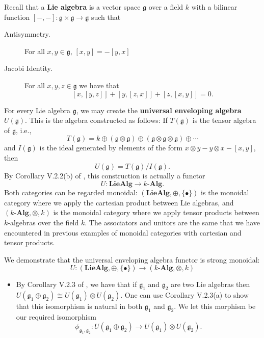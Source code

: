 \begin{example}
    Recall that a \textbf{Lie algebra} is a vector space $\mathfrak{g}$ over a field $k$ 
    with a bilinear function $[-,-]: \mathfrak{g} \times \mathfrak{g} \to \mathfrak{g}$ such that 
    \begin{description}
        \item[Antisymmetry.] For all $x, y \in \mathfrak{g}$, $[x, y] = -[y, x]$
        \item[Jacobi Identity.] For all $x, y, z \in \mathfrak{g}$ we have that 
        \[
            [x, [y, z]] + [y, [z, x]] + [z, [x,y]] = 0.
        \]
    \end{description}
    For every Lie algebra $\mathfrak{g}$, we may create the \textbf{universal enveloping algebra} 
    $U(\mathfrak{g})$. This is the algebra constructed as 
    follows: If $T(\mathfrak{g})$ is the tensor algebra of $\mathfrak{g}$, i.e., 
    \[
        T(\mathfrak{g}) = k \oplus (\mathfrak{g} \otimes \mathfrak{g}) \oplus (\mathfrak{g} \otimes \mathfrak{g} \otimes \mathfrak{g}) \oplus \cdots 
    \]
    and $I(\mathfrak{g})$ is the ideal generated by elements of the form $x\otimes y - y \otimes x - [x,y]$, 
    then 
    \[
        U(\mathfrak{g}) = T(\mathfrak{g})/I(\mathfrak{g}).
    \]
    By Corollary V.2.2(b) of \cite{quantumgroups}, this construction is actually a functor 
    \[
        U: \textbf{LieAlg} \to k\textbf{-Alg}.
    \]
    Both categories can be regarded monoidal: $(\textbf{LieAlg}, \oplus, \{\bullet\})$ 
    is the monoidal category where we apply the cartesian product between Lie algebras, 
    and $(k\textbf{-Alg}, \otimes, k)$ is the monoidal category 
    where we apply tensor products between $k$-algebras over the field $k$. 
    The associators and unitors are the same that we have encountered in
    previous examples of monoidal categories with 
    cartesian and tensor products.

    We demonstrate that the universal enveloping algebra functor 
    is strong monoidal:
    \[
        U: (\textbf{LieAlg}, \oplus, \{\bullet\})  
        \to 
        (k\textbf{-Alg}, \otimes, k)
    \]
    \begin{itemize}
        \item By Corollary V.2.3 of \cite{quantumgroups}, we have that if 
        $\mathfrak{g_1}$ and $\mathfrak{g_2}$ are two Lie algebras 
        then $U(\mathfrak{g}_1 \oplus \mathfrak{g}_2) \cong U(\mathfrak{g}_1) \otimes U(\mathfrak{g}_2)$.
        One can use Corollary V.2.3(a) to show that this isomorphism is natural in both $\mathfrak{g}_1$ and 
        $\mathfrak{g}_2$. We let this morphism be our required isomorphism
        \[
            \phi_{\mathfrak{g}_1, \mathfrak{g}_2}: U(\mathfrak{g}_1\oplus \mathfrak{g}_2)  
            \to U(\mathfrak{g}_1)\otimes U(\mathfrak{g}_2).
        \]


\end{itemize}
\end{example}
